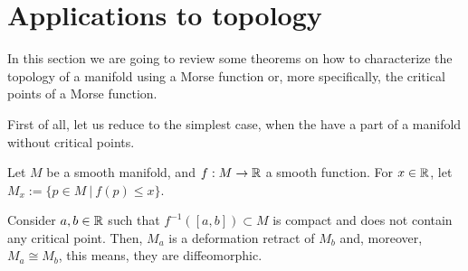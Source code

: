 \section{Applications to topology} \label{section:morse_topology}

In this section we are going to review some theorems on how to characterize the topology of a manifold using a Morse function or, more specifically, the critical points of a Morse function.

First of all, let us reduce to the simplest case, when the have a part of a manifold without critical points.

Let $M$ be a smooth manifold, and $f : M \rightarrow \mathbb{R}$ a smooth function. For $x \in \mathbb{R}$, let $M_x := \{p \in M \ | \ f(p) \leq x\}$.

\begin{prop} \label{nocriticalpoints}
Consider $a, b \in \mathbb{R}$ such that $f^{-1}([a,b]) \subset M$ is compact and does not contain any critical point. Then, $M_a$ is a deformation retract of $M_b$ and, moreover, $M_a \cong M_b$, this means, they are diffeomorphic.
\end{prop}

